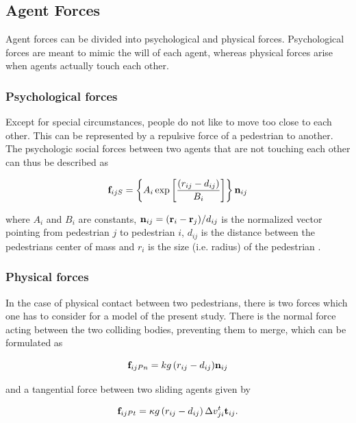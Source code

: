 \documentclass[11pt]{article}
\begin{document}
\subsection{Agent Forces}
Agent forces can be divided into psychological and physical forces. Psychological forces are meant to mimic the will of each agent, whereas physical forces arise when agents actually touch each other.

\subsubsection{Psychological forces}
Except for special circumstances, people do not like to move too close to each other. This can be represented by a repulsive force of a pedestrian to another. The psychologic social forces between two agents that are not touching each other can thus be described as

\begin{equation}
	{{\bf f}_{ijS}} = \left\{ {{A_i}\exp \left[ {\frac{{\left( {{r_{ij}} - {d_{ij}}} \right)}}{{{B_i}}}} \right] } \right\}{{\bf n}_{ij}} 
		\label{eq:fijS}
\end{equation}

where $A_i$ and $B_i$ are constants, ${\bf n}_{ij} = ({\bf r}_i - {\bf r}_j)/d_{ij}$ is the normalized vector pointing from pedestrian $j$ to pedestrian $i$, $d_{ij}$ is the distance between the pedestrians center of mass and $r_i$ is the size (i.e. radius) of the pedestrian \citep{Helbing2000}. 

\subsubsection{Physical forces}

In the case of physical contact between two pedestrians, there is two forces which one has to consider for a model of the present study. There is the normal force acting between the two colliding bodies, preventing them to merge, which can be formulated as

\begin{equation}
	{{\bf f}_{ijPn}} = {kg\left( {{r_{ij}} - {d_{ij}}} \right)} {{\bf n}_{ij}}
		\label{eq:fijPn}
\end{equation}

and a tangential force between two sliding agents given by

\begin{equation}
	{{\bf f}_{ijPt}} = \kappa g\left( {{r_{ij}} - {d_{ij}}} \right)\Delta v_{ji}^t{{\bf t}_{ij}} .
		\label{eq:fijPt}
\end{equation}
\end{document}
